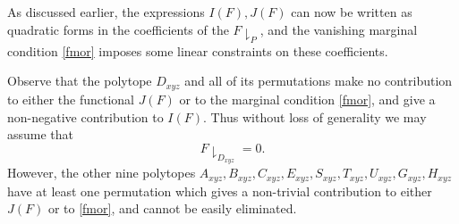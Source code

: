 As discussed earlier, the expressions $I(F), J(F)$ can now be written as quadratic forms in the coefficients of the $F\downharpoonright_P$, and the vanishing marginal condition \eqref{fmor} imposes some linear constraints on these coefficients.

Observe that the polytope $D_{xyz}$ and all of its permutations make no contribution to either the functional $J(F)$ or to the marginal condition \eqref{fmor}, and give a non-negative contribution to $I(F)$.  Thus without loss of generality we may assume that
$$ F\downharpoonright_{D_{xyz}} = 0.$$
However, the other nine polytopes $A_{xyz}, B_{xyz}, C_{xyz}, E_{xyz}, S_{xyz}, T_{xyz}, U_{xyz}, G_{xyz}, H_{xyz}$ have at least one permutation which gives a non-trivial contribution to either $J(F)$ or to \eqref{fmor}, and cannot be easily eliminated.

